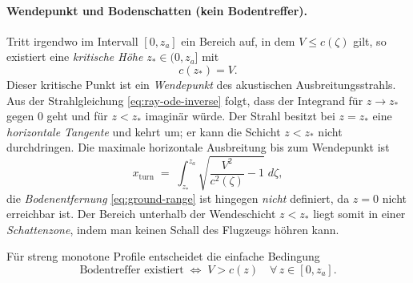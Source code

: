 \paragraph{Wendepunkt und Bodenschatten (kein Bodentreffer).}
Tritt irgendwo im Intervall $[0,z_a]$ ein Bereich auf, in dem
$V\le c(\zeta)$ gilt, so existiert eine
\emph{kritische Höhe} $z_\ast\in(0,z_a]$ mit
\begin{equation}
    c(z_\ast)=V.
    \label{eq:turning-def}
\end{equation}
Dieser kritische Punkt ist ein \emph{Wendepunkt} des akustischen Ausbreitungsstrahls.
Aus der Strahlgleichung \eqref{eq:ray-ode-inverse} folgt, dass der
Integrand für $z\to z_\ast$ gegen $0$ geht und für $z<z_\ast$ imaginär würde.
Der Strahl besitzt bei $z=z_\ast$ eine \emph{horizontale Tangente} und kehrt um;
er kann die Schicht $z<z_\ast$ nicht durchdringen.
Die maximale horizontale Ausbreitung bis zum Wendepunkt ist
\begin{equation}
    x_{\mathrm{turn}}
    \;=\; \int_{z_\ast}^{z_a} \sqrt{\frac{V^2}{c^2(\zeta)}-1}\;d\zeta,
    \label{eq:x-turn}
\end{equation}
die \emph{Bodenentfernung} \eqref{eq:ground-range} ist hingegen \emph{nicht}
definiert, da $z=0$ nicht erreichbar ist.
Der Bereich unterhalb der Wendeschicht $z<z_\ast$ liegt somit in einer
\emph{Schattenzone}, indem man keinen Schall des Flugzeugs höhren kann.

Für streng monotone Profile entscheidet die einfache Bedingung
\begin{equation}
    \text{Bodentreffer existiert} \;\Leftrightarrow\; V>c(z)\quad\forall\,z\in[0,z_a].
    \label{eq:ground-hit-condition}
\end{equation}





